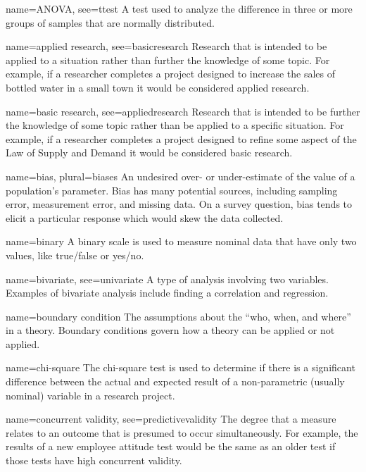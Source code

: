 {name={ANOVA},
	see={ttest}}
{%
	A test used to analyze the difference in three or more groups of samples that are normally distributed.
}

{name={applied research},
 see={basicresearch}}
{%
	Research that is intended to be applied to a situation rather than further the knowledge of some topic. For example, if a researcher completes a project designed to increase the sales of bottled water in a small town it would be considered applied research.
}

{name={basic research},
	see={appliedresearch}}
{%
	Research that is intended to be further the knowledge of some topic rather than be applied to a specific situation. For example, if a researcher completes a project designed to refine some aspect of the Law of Supply and Demand it would be considered basic research.  
}

{name={bias},
 plural={biases}}
{%
	An undesired over- or under-estimate of the value of a population's parameter. Bias has many potential sources, including sampling error, measurement error, and missing data. On a survey question, bias tends to elicit a particular response which would skew the data collected.
}

{name={binary}}
{%
	A binary scale is used to measure nominal data that have only two values, like true/false or yes/no.
}

{name={bivariate},
	see={univariate}}
{%
	A type of analysis involving two variables. Examples of bivariate analysis include finding a correlation and regression.
}

{name={boundary condition}}
{%
	The assumptions about the ``who, when, and where'' in a theory. Boundary conditions govern how a theory can be applied or not applied.
}

{name={chi-square}}
{%
	The chi-square test is used to determine if there is a significant difference between the actual and expected result of a non-parametric (usually nominal) variable in a research project.
}

{name={concurrent validity},
	see={predictivevalidity}}
{%
	The degree that a measure relates to an outcome that is presumed to occur simultaneously. For example, the results of a new employee attitude test would be the same as an older test if those tests have high concurrent validity.
}

